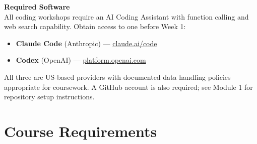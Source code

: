 \documentclass[9pt]{extarticle}
\begin{document}
\medskip

\textbf{Required Software} \\
All coding workshops require an AI Coding Assistant with function calling and web
search capability. Obtain access to one before Week 1:
\begin{itemize}
    \item \textbf{Claude Code} (Anthropic) --- \href{https://claude.ai/code}{claude.ai/code}
    \item \textbf{Codex} (OpenAI) --- \href{https://platform.openai.com/}{platform.openai.com}
\end{itemize}
All three are US-based providers with documented data handling policies appropriate
for coursework. A GitHub account is also required; see Module 1 for repository
setup instructions.

\section*{Course Requirements}
\end{document}

